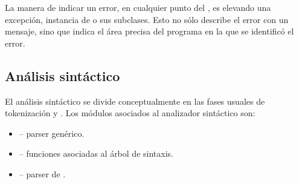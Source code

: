 \documentclass{article}
\begin{document}
La manera de indicar un error, en cualquier punto del ,
es elevando una excepci\'on, instancia de 
o sus subclases. Esto no s\'olo describe el error con un mensaje,
sino que indica el \'area precisa del programa en la que se
identific\'o el error.

\subsection{An\'alisis sint\'actico}

El an\'alisis sint\'actico se divide conceptualmente en las fases
usuales de tokeni\-zaci\'on y . Los m\'odulos asociados
al analizador sint\'actico son:
\begin{itemize}
\item {} -- parser gen\'erico.
\item {} -- funciones asociadas al \'arbol de sintaxis.
\item {} -- parser de \Gbs.
\end{itemize}

\subsubsection{}
\end{document}
